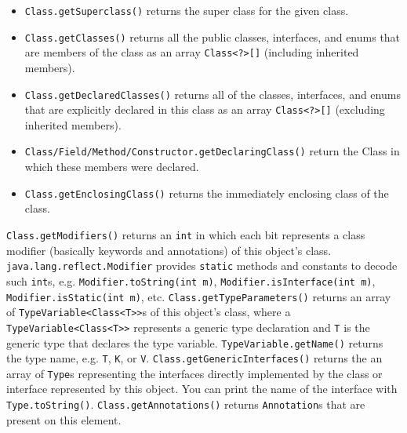 \documentclass[table, xcdraw]{article}%
\begin{document}
\begin{itemize}
    \item \texttt{Class.getSuperclass()} returns the super class for the given class.
    \item  \texttt{Class.getClasses()} returns all the public classes, interfaces, and enums that are members of the class as an array \texttt{Class<?>[]} (including inherited members).
    \item \texttt{Class.getDeclaredClasses()} returns all of the classes, interfaces, and enums that are explicitly declared in this class as an array \texttt{Class<?>[]} (excluding inherited members).
    \item \texttt{Class/Field/Method/Constructor.getDeclaringClass()} return the Class in which these members were declared.
    \item \texttt{Class.getEnclosingClass()} returns the immediately enclosing class of the class.
\end{itemize}

\texttt{Class.getModifiers()} returns an \texttt{int} in which each bit represents a class modifier (basically keywords and annotations) of this object's class. \texttt{java.lang.reflect.Modifier} provides \texttt{static} methods and constants to decode such \texttt{int}s, e.g. \texttt{Modifier.toString(int m)}, \texttt{Modifier.isInterface(int m)}, \texttt{Modifier.isStatic(int m)}, etc. \texttt{Class.getTypeParameters()} returns an array of \texttt{TypeVariable<Class<T>>}s of this object's class, where a \texttt{TypeVariable<Class<T>>} represents a generic type declaration and \texttt{T} is the generic type that declares the type variable. \texttt{TypeVariable.getName()} returns the type name, e.g. \texttt{T}, \texttt{K}, or \texttt{V}. \texttt{Class.getGenericInterfaces()} returns the an array of \texttt{Type}s representing the interfaces directly implemented by the class or interface represented by this object. You can print the name of the interface with \texttt{Type.toString()}. \texttt{Class.getAnnotations()} returns \texttt{Annotation}s that are present on this element.
\end{document}
